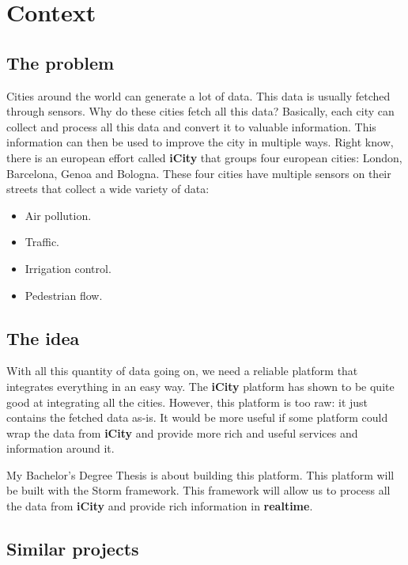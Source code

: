 \documentclass[a4paper,12pt]{article}
\newcommand{\mylist}{
\begin{itemize}
\setlength{\itemsep}{1pt}
\setlength{\parskip}{0pt}
\setlength{\parsep}{0pt}}
\newcommand{\mylistend}{\end{itemize}}
\begin{document}


\thispagestyle{empty}
\tableofcontents{\newpage}

\setcounter{page}{1}

\section{Context}

\subsection{The problem}

Cities around the world can generate a lot of data. This data is usually
fetched through sensors. Why do these cities fetch all this data? Basically,
each city can collect and process all this data and convert it to valuable
information. This information can then be used to improve the city in multiple
ways. Right know, there is an european effort called {\bf iCity} that groups
four european cities: London, Barcelona, Genoa and Bologna. These four cities
have multiple sensors on their streets that collect a wide variety of data:

\mylist
  \item Air pollution.
  \item Traffic.
  \item Irrigation control.
  \item Pedestrian flow.
\mylistend

\subsection{The idea}

With all this quantity of data going on, we need a reliable platform that
integrates everything in an easy way. The {\bf iCity} platform has shown to be
quite good at integrating all the cities. However, this platform is too raw: it
just contains the fetched data as-is. It would be more useful if some platform
could wrap the data from {\bf iCity} and provide more rich and useful services
and information around it.

My Bachelor's Degree Thesis is about building this platform. This platform will
be built with the Storm framework. This framework will allow us to process all
the data from {\bf iCity} and provide rich information in {\bf realtime}.

\subsection{Similar projects}
\end{document}
